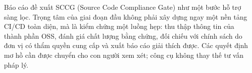 \documentclass[11pt,a4paper,oneside]{report}
\begin{document}
Báo cáo đề xuất SCCG (Source Code Compliance Gate) như một bước hỗ trợ sàng lọc. Trọng tâm của giai đoạn đầu không phải xây dựng ngay một nền tảng CI/CD toàn diện, mà là kiểm chứng một luồng hẹp: thu thập thông tin của thành phần OSS, đánh giá chất lượng bằng chứng, đối chiếu với chính sách do đơn vị có thẩm quyền cung cấp và xuất báo cáo giải thích được. Các quyết định mơ hồ cần được chuyển cho con người xem xét; công cụ không thay thế tư vấn pháp lý.

\tableofcontents
\listoftables
\clearpage
{}






\printbibliography[title={Tài liệu tham khảo}]
\end{document}
